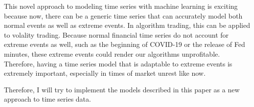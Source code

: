 \documentclass[12pt,letterpaper]{pset}
\begin{document}
\begin{solution}
 This novel approach to modeling time series with machine learning is exciting because now, there can be a generic time series that can accurately model both normal events as well as extreme events. In algorithm trading, this can be applied to volality trading. Because normal financial time series do not account for extreme events as well, such as the beginning of COVID-19 or the release of Fed minutes, these extreme events could render our algorithms unprofitable. Therefore, having a time series model that is adaptable to extreme events is extremely important, especially in times of market unrest like now.
 
 Therefore, I will try to implement the models described in this paper as a new approach to time series data.
 
 
\end{solution}

\newpage
\end{document}
